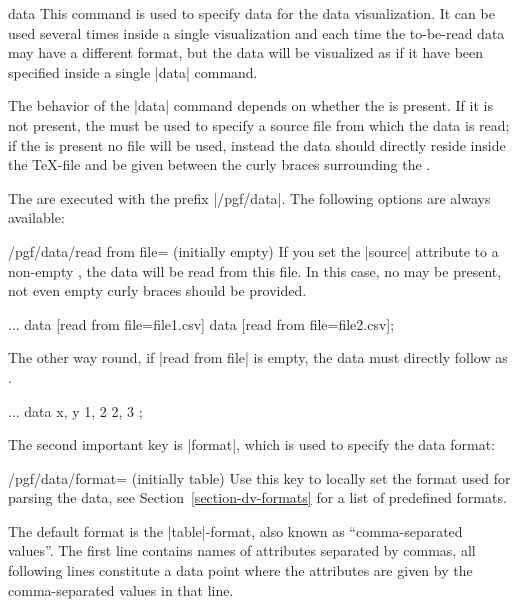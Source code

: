 \begin{datavisualizationoperation}{data}{}
    This command is used to specify data for the data visualization. It can be
    used several times inside a single visualization and each time the
    to-be-read data may have a different format, but the data will be
    visualized as if it have been specified inside a single |data| command.

    The behavior of the |data| command depends on whether the  is present. If it is not present, the  must be used to
    specify a source file from which the data is read; if the  is present no file will be used, instead the data should directly
    reside inside the \TeX-file and be given between the curly braces
    surrounding the .

    The  are executed with the prefix |/pgf/data|. The following
    options are always available:
    \begin{key}{/pgf/data/read from file= (initially \normalfont empty)}
        If you set the |source| attribute to a non-empty , the
        data will be read from this file. In this case, no 
        may be present, not even empty curly braces should be provided.
\begin{codeexample}
\datavisualization ...
  data [read from file=file1.csv]
  data [read from file=file2.csv];
\end{codeexample}
        The other way round, if |read from file| is empty, the  data must
        directly follow as .
\begin{codeexample}
\datavisualization ...
  data {
    x, y
    1, 2
    2, 3
  };
\end{codeexample}
    \end{key}
    The second important key is |format|, which is used to specify the data
    format:
    \begin{key}{/pgf/data/format= (initially table)}
        Use this key to locally set the format used for parsing the data, see
        Section~\ref{section-dv-formats} for a list of predefined formats.

        The default format is the |table|-format, also known as
        ``comma-separated values''. The first line contains names of attributes
        separated by commas, all following lines constitute a data point where
        the attributes are given by the comma-separated values in that line.
    \end{key}



\end{datavisualizationoperation}
